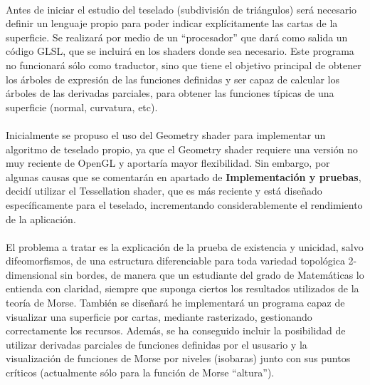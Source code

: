 \\Antes de iniciar el estudio del teselado (subdivisión de triángulos) será necesario definir un lenguaje propio para poder indicar explícitamente las cartas de la superficie. Se realizará por medio de un ``procesador'' que dará como salida un código GLSL, que se incluirá en los shaders donde sea necesario. Este programa no funcionará sólo como traductor, sino que tiene el objetivo principal de obtener los árboles de expresión de las funciones definidas y ser capaz de calcular los árboles de las derivadas parciales, para obtener las funciones típicas de una superficie (normal, curvatura, etc).\\
\\Inicialmente se propuso el uso del Geometry shader para implementar un algoritmo de teselado propio, ya que el Geometry shader requiere una versión no muy reciente de OpenGL y aportaría mayor flexibilidad. Sin embargo, por algunas causas que se comentarán en apartado de \textbf{Implementación y pruebas}, decidí utilizar el Tessellation shader, que es más reciente y está diseñado específicamente para el teselado, incrementando considerablemente el rendimiento de la aplicación.\\
\\El problema a tratar es la explicación de la prueba de existencia y unicidad, salvo difeomorfismos, de una estructura diferenciable para toda variedad topológica 2-dimensional sin bordes, de manera que un estudiante del grado de Matemáticas lo entienda con claridad, siempre que suponga ciertos los resultados utilizados de la teoría de Morse. También se diseñará he implementará un programa capaz de visualizar una superficie por cartas, mediante rasterizado, gestionando correctamente los recursos. Además, se ha conseguido incluir la posibilidad de utilizar derivadas parciales de funciones definidas por el ususario y la visualización de funciones de Morse por niveles (isobaras) junto con sus puntos críticos (actualmente sólo para la función de Morse ``altura'').

